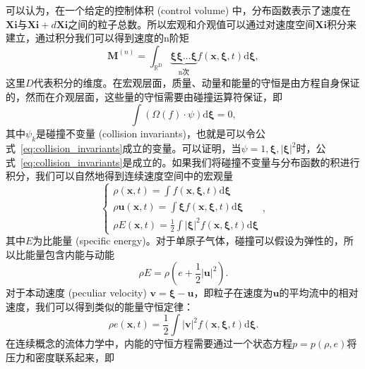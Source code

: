 可以认为，在一个给定的控制体积 (control volume) 中，分布函数表示了速度在$\boldsymbol{Xi}$与$\boldsymbol{Xi}+d\boldsymbol{Xi}$之间的粒子总数。所以宏观和介观值可以通过对速度空间$\boldsymbol{Xi}$积分来建立，通过积分我们可以得到速度的n阶矩
\begin{equation}
    \boldsymbol{M}^{(n)}=\int_{\mathbb{R}^{\mathrm{D}}} \underbrace{\boldsymbol{\xi} \boldsymbol{\xi} \ldots \boldsymbol{\xi}}_{\mathrm{n} \text {次}} f(\boldsymbol{x}, \boldsymbol{\xi}, t) \mathrm{d} \boldsymbol{\xi},
\end{equation}
这里$D$代表积分的维度。在宏观层面，质量、动量和能量的守恒是由方程自身保证的，然而在介观层面，这些量的守恒需要由碰撞运算符保证，即
\begin{equation}
    \int\left(\Omega(f) \cdot \psi\right) \mathrm{d} \boldsymbol{\xi}=0,
    \label{eq:collision_invariants}
\end{equation}
其中$\psi_k$是碰撞不变量 (collision invariants)，也就是可以令公式~\ref{eq:collision_invariants}成立的变量。可以证明，当$\psi=1, \boldsymbol{\xi}, |\boldsymbol{\xi}|^2$时，公式~\ref{eq:collision_invariants}是成立的。如果我们将碰撞不变量与分布函数的积进行积分，我们可以自然地得到连续速度空间中的宏观量
\begin{equation}
    \left\{\begin{array}{l}\rho(\boldsymbol{x}, t)=\int f(\boldsymbol{x}, \boldsymbol{\xi}, t) \mathrm{d} \boldsymbol{\xi} \\ \rho \boldsymbol{u}(\boldsymbol{x}, t)=\int \boldsymbol{\xi} f(\boldsymbol{x}, \boldsymbol{\xi}, t) \mathrm{d} \boldsymbol{\xi} \\ \rho E(\boldsymbol{x}, t)=\frac{1}{2} \int|\boldsymbol{\xi}|^2 f(\boldsymbol{x}, \boldsymbol{\xi}, t) \mathrm{d} \boldsymbol{\xi}\end{array}\right.,
\end{equation}
其中$E$为比能量 (specific energy)。对于单原子气体，碰撞可以假设为弹性的，所以比能量包含内能与动能
\begin{equation}
    \rho E=\rho\left(e+\frac{1}{2}|\boldsymbol{u}|^2\right).
\end{equation}
对于本动速度 (peculiar velocity) $\boldsymbol{v}=\boldsymbol{\xi}-\boldsymbol{u}$，即粒子在速度为$\boldsymbol{u}$的平均流中的相对速度，我们可以得到类似的能量守恒定律：
\begin{equation}
    \rho e(\boldsymbol{x}, t)=\frac{1}{2} \int|\boldsymbol{v}|^2 f(\boldsymbol{x}, \boldsymbol{\xi}, t) \mathrm{d} \boldsymbol{\xi}.
\end{equation}
在连续概念的流体力学中，内能的守恒方程需要通过一个状态方程$p=p(\rho,e)$将压力和密度联系起来，即
